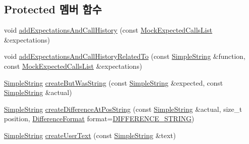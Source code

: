 \subsection*{Protected 멤버 함수}
\begin{DoxyCompactItemize}
\item 
void \hyperlink{class_mock_failure_a95016259655d22804930338a0223a18e}{add\+Expectations\+And\+Call\+History} (const \hyperlink{class_mock_expected_calls_list}{Mock\+Expected\+Calls\+List} \&expectations)
\item 
void \hyperlink{class_mock_failure_a24651d311fc939aed3e710afee30edbf}{add\+Expectations\+And\+Call\+History\+Related\+To} (const \hyperlink{class_simple_string}{Simple\+String} \&function, const \hyperlink{class_mock_expected_calls_list}{Mock\+Expected\+Calls\+List} \&expectations)
\item 
\hyperlink{class_simple_string}{Simple\+String} \hyperlink{class_test_failure_a14e11a7282409ba8fb985ab58c983856}{create\+But\+Was\+String} (const \hyperlink{class_simple_string}{Simple\+String} \&expected, const \hyperlink{class_simple_string}{Simple\+String} \&actual)
\item 
\hyperlink{class_simple_string}{Simple\+String} \hyperlink{class_test_failure_a61d48c22fc7e93fe35b7d2c596c3a39e}{create\+Difference\+At\+Pos\+String} (const \hyperlink{class_simple_string}{Simple\+String} \&actual, size\+\_\+t position, \hyperlink{class_test_failure_aaadecd271c82449768993cbf919de0a2}{Difference\+Format} format=\hyperlink{class_test_failure_aaadecd271c82449768993cbf919de0a2a1246a1a469970104212c9113e3f057c9}{D\+I\+F\+F\+E\+R\+E\+N\+C\+E\+\_\+\+S\+T\+R\+I\+NG})
\item 
\hyperlink{class_simple_string}{Simple\+String} \hyperlink{class_test_failure_ae67765ada519d8a163922f50099a0016}{create\+User\+Text} (const \hyperlink{class_simple_string}{Simple\+String} \&text)
\end{DoxyCompactItemize}
